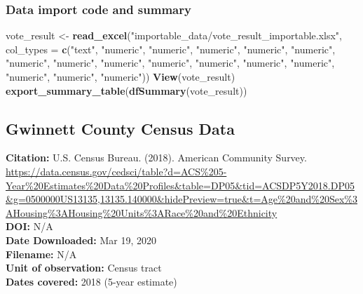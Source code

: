 \documentclass[
]{article}
\newenvironment{Shaded}{\begin{snugshade}}{\end{snugshade}}
\newcommand{\DataTypeTok}[1]{\textcolor[rgb]{0.13,0.29,0.53}{#1}}
\newcommand{\KeywordTok}[1]{\textcolor[rgb]{0.13,0.29,0.53}{\textbf{#1}}}
\newcommand{\NormalTok}[1]{#1}
\newcommand{\StringTok}[1]{\textcolor[rgb]{0.31,0.60,0.02}{#1}}
\begin{document}
\hypertarget{data-import-code-and-summary}{%
\subsubsection{Data import code and
summary}\label{data-import-code-and-summary}}

\begin{Shaded}
\begin{Highlighting}[]
\NormalTok{vote_result <-}\StringTok{ }\KeywordTok{read_excel}\NormalTok{(}\StringTok{"importable_data/vote_result_importable.xlsx"}\NormalTok{, }
    \DataTypeTok{col_types =} \KeywordTok{c}\NormalTok{(}\StringTok{"text"}\NormalTok{, }\StringTok{"numeric"}\NormalTok{, }\StringTok{"numeric"}\NormalTok{, }
        \StringTok{"numeric"}\NormalTok{, }\StringTok{"numeric"}\NormalTok{, }\StringTok{"numeric"}\NormalTok{, }
        \StringTok{"numeric"}\NormalTok{, }\StringTok{"numeric"}\NormalTok{, }\StringTok{"numeric"}\NormalTok{, }\StringTok{"numeric"}\NormalTok{, }
        \StringTok{"numeric"}\NormalTok{, }\StringTok{"numeric"}\NormalTok{, }\StringTok{"numeric"}\NormalTok{, }\StringTok{"numeric"}\NormalTok{, }\StringTok{"numeric"}\NormalTok{, }
        \StringTok{"numeric"}\NormalTok{))}
\KeywordTok{View}\NormalTok{(vote_result)}
\KeywordTok{export_summary_table}\NormalTok{(}\KeywordTok{dfSummary}\NormalTok{(vote_result))}
\end{Highlighting}
\end{Shaded}

\hypertarget{gwinnett-county-census-data}{%
\subsection{Gwinnett County Census
Data}\label{gwinnett-county-census-data}}

\textbf{Citation:} U.S. Census Bureau. (2018). American Community
Survey.
\url{https://data.census.gov/cedsci/table?d=ACS\%205-Year\%20Estimates\%20Data\%20Profiles\&table=DP05\&tid=ACSDP5Y2018.DP05\&g=0500000US13135,13135.140000\&hidePreview=true\&t=Age\%20and\%20Sex\%3AHousing\%3AHousing\%20Units\%3ARace\%20and\%20Ethnicity}\\
\textbf{DOI:} N/A\\
\textbf{Date Downloaded:} Mar 19, 2020\\
\textbf{Filename:} N/A\\
\textbf{Unit of observation:} Census tract\\
\textbf{Dates covered:} 2018 (5-year estimate)
\end{document}
